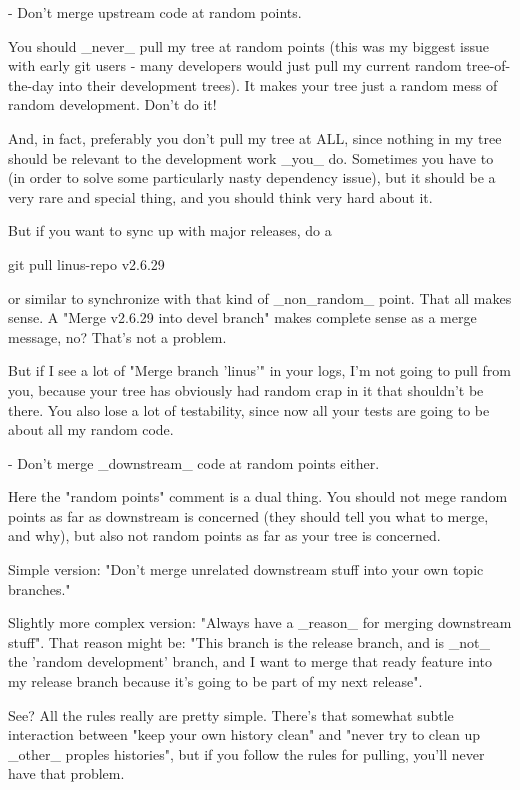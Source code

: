  - Don't merge upstream code at random points. 

   You should _never_ pull my tree at random points (this was my biggest 
   issue with early git users - many developers would just pull my current 
   random tree-of-the-day into their development trees). It makes your 
   tree just a random mess of random development. Don't do it!

   And, in fact, preferably you don't pull my tree at ALL, since nothing 
   in my tree should be relevant to the development work _you_ do. 
   Sometimes you have to (in order to solve some particularly nasty 
   dependency issue), but it should be a very rare and special thing, and 
   you should think very hard about it.

   But if you want to sync up with major releases, do a

        git pull linus-repo v2.6.29

   or similar to synchronize with that kind of _non_random_ point. That 
   all makes sense. A "Merge v2.6.29 into devel branch" makes complete 
   sense as a merge message, no? That's not a problem.

   But if I see a lot of "Merge branch 'linus'" in your logs, I'm not 
   going to pull from you, because your tree has obviously had random crap 
   in it that shouldn't be there. You also lose a lot of testability, 
   since now all your tests are going to be about all my random code.

 - Don't merge _downstream_ code at random points either.

   Here the "random points" comment is a dual thing. You should not mege 
   random points as far as downstream is concerned (they should tell you 
   what to merge, and why), but also not random points as far as your tree 
   is concerned.

   Simple version: "Don't merge unrelated downstream stuff into your own 
   topic branches."

   Slightly more complex version: "Always have a _reason_ for merging 
   downstream stuff". That reason might be: "This branch is the release 
   branch, and is _not_ the 'random development' branch, and I want to 
   merge that ready feature into my release branch because it's going to 
   be part of my next release".

See? All the rules really are pretty simple. There's that somewhat subtle 
interaction between "keep your own history clean" and "never try to clean 
up _other_ proples histories", but if you follow the rules for pulling, 
you'll never have that problem.

